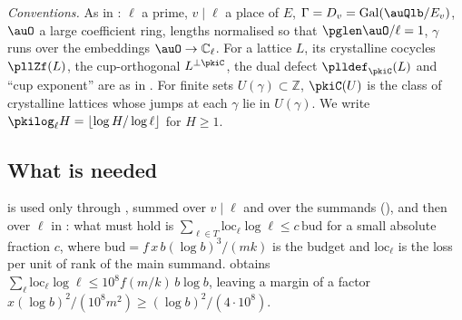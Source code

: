 \documentclass[10pt]{amsart}
\theoremstyle{definition}
\theoremstyle{remark}
\newcommand{\C}{\mathbb C}
\newcommand{\Z}{\mathbb Z}
\providecommand{\aubud}{\mathrm{bud}}
\providecommand{\pgloc}{\mathrm{loc}}
\begin{document}
\emph{Conventions.} As in {\cite[\S5]{P55}}: $\ell$ a prime, $v\mid\ell$ a place of $E$,
$\Gamma=D_v=\operatorname{Gal}(\auQlb/E_v)$, $\auO$ a large coefficient ring, lengths normalised so
that $\pglen\auO/\ell=1$, $\gamma$ runs over the embeddings $\auO\to\C_\ell$. For a lattice $L$, its
crystalline cocycles $\pllZf(L)$, the cup-orthogonal $L^{\perp\pkiC}$, the dual defect
$\plldef_\pkiC(L)$ and ``cup exponent'' are as in {\cite[Definition~5.1]{P55}}. For finite sets
$U(\gamma)\subset\Z$, $\pkiC(U)$ is the class of crystalline lattices whose jumps at each $\gamma$
lie in $U(\gamma)$. We write $\pkilog_\ell H=\lfloor\log H/\log\ell\rfloor$ for $H\ge1$.

\subsection{What is needed}\label{pki:ss-need}

{\cite[Theorem~5.8]{P55}} is used only through {\cite[(9)]{P55}}, summed over $v\mid\ell$ and
over the summands ({\cite[Lemma~5.10]{P55}}), and then over $\ell$ in {\cite[Lemma~2.5]{P55}}: what must hold
is $\sum_{\ell\in T}\pgloc_\ell\log\ell\le c\,\aubud$ for a small absolute fraction $c$, where
$\aubud=f\,x\,b(\log b)^3/(mk)$ is the budget and $\pgloc_\ell$ is the loss per unit of rank of the
main summand. {\cite[Lemma~2.5]{P55}} obtains $\sum_\ell\pgloc_\ell\log\ell\le 10^8f(m/k)\,b\log b$,
leaving a margin of a factor $x(\log b)^2/(10^8m^2)\ge(\log b)^2/(4\cdot10^8)$.
\end{document}
